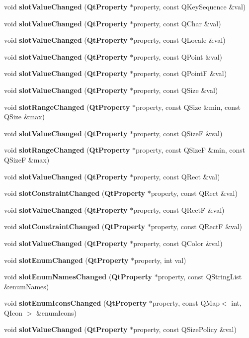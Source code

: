 \begin{DoxyCompactItemize}
\item 
void {\bf slot\+Value\+Changed} ({\bf Qt\+Property} $\ast$property, const Q\+Key\+Sequence \&val)
\item 
void {\bf slot\+Value\+Changed} ({\bf Qt\+Property} $\ast$property, const Q\+Char \&val)
\item 
void {\bf slot\+Value\+Changed} ({\bf Qt\+Property} $\ast$property, const Q\+Locale \&val)
\item 
void {\bf slot\+Value\+Changed} ({\bf Qt\+Property} $\ast$property, const Q\+Point \&val)
\item 
void {\bf slot\+Value\+Changed} ({\bf Qt\+Property} $\ast$property, const Q\+PointF \&val)
\item 
void {\bf slot\+Value\+Changed} ({\bf Qt\+Property} $\ast$property, const Q\+Size \&val)
\item 
void {\bf slot\+Range\+Changed} ({\bf Qt\+Property} $\ast$property, const Q\+Size \&min, const Q\+Size \&max)
\item 
void {\bf slot\+Value\+Changed} ({\bf Qt\+Property} $\ast$property, const Q\+SizeF \&val)
\item 
void {\bf slot\+Range\+Changed} ({\bf Qt\+Property} $\ast$property, const Q\+SizeF \&min, const Q\+SizeF \&max)
\item 
void {\bf slot\+Value\+Changed} ({\bf Qt\+Property} $\ast$property, const Q\+Rect \&val)
\item 
void {\bf slot\+Constraint\+Changed} ({\bf Qt\+Property} $\ast$property, const Q\+Rect \&val)
\item 
void {\bf slot\+Value\+Changed} ({\bf Qt\+Property} $\ast$property, const Q\+RectF \&val)
\item 
void {\bf slot\+Constraint\+Changed} ({\bf Qt\+Property} $\ast$property, const Q\+RectF \&val)
\item 
void {\bf slot\+Value\+Changed} ({\bf Qt\+Property} $\ast$property, const Q\+Color \&val)
\item 
void {\bf slot\+Enum\+Changed} ({\bf Qt\+Property} $\ast$property, int val)
\item 
void {\bf slot\+Enum\+Names\+Changed} ({\bf Qt\+Property} $\ast$property, const Q\+String\+List \&enum\+Names)
\item 
void {\bf slot\+Enum\+Icons\+Changed} ({\bf Qt\+Property} $\ast$property, const Q\+Map$<$ int, Q\+Icon $>$ \&enum\+Icons)
\item 
void {\bf slot\+Value\+Changed} ({\bf Qt\+Property} $\ast$property, const Q\+Size\+Policy \&val)
\item 

\end{DoxyCompactItemize}
